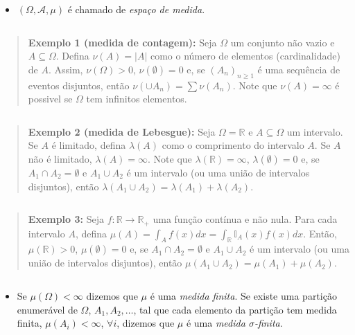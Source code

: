 \documentclass[
]{book}
\providecommand{\tightlist}{%
  \setlength{\itemsep}{0pt}\setlength{\parskip}{0pt}}
\begin{document}
\begin{itemize}
\tightlist
\item
  \((\Omega,\mathcal{A}, \mu)\) é chamado de \emph{espaço de medida}.
\end{itemize}

\(~\)

\begin{quote}
\textbf{Exemplo 1 (medida de contagem):} Seja \(\Omega\) um conjunto não vazio e \(A\subseteq \Omega\). Defina \(\nu(A)=|A|\) como o número de elementos (cardinalidade) de \(A\). Assim, \(\nu(\Omega) > 0\), \(\nu(\emptyset)=0\) e, se \((A_n)_{n \geq 1}\) é uma sequência de eventos disjuntos, então \(\nu(\cup A_n) = \sum \nu(A_n)\). Note que \(\nu(A)=\infty\) é possivel se \(\Omega\) tem infinitos elementos.
\end{quote}

\(~\)

\begin{quote}
\textbf{Exemplo 2 (medida de Lebesgue):} Seja \(\Omega=\mathbb{R}\) e \(A\subseteq \Omega\) um intervalo. Se \(A\) é limitado, defina \(\lambda(A)\) como o comprimento do intervalo \(A\). Se \(A\) não é limitado, \(\lambda(A)=\infty\). Note que \(\lambda(\mathbb{R})=\infty\), \(\lambda(\emptyset)=0\) e, se \(A_1 \cap A_2 = \emptyset\) e \(A_1 \cup A_2\) é um intervalo (ou uma união de intervalos disjuntos), então \(\lambda(A_1 \cup A_2) = \lambda(A_1) + \lambda(A_2)\).
\end{quote}

\(~\)

\begin{quote}
\textbf{Exemplo 3:} Seja \(f: \mathbb{R} \longrightarrow \mathbb{R}_+\) uma função contínua e não nula. Para cada intervalo \(A\), defina \(\displaystyle \mu(A) = \int_A f(x) dx = \int_{\mathbb{R}} \mathbb{I}_A(x) f(x) dx\). Então, \(\mu(\mathbb{R})>0\), \(\mu(\emptyset)=0\) e, se \(A_1 \cap A_2 = \emptyset\) e \(A_1 \cup A_2\) é um intervalo (ou uma união de intervalos disjuntos), então \(\mu(A_1 \cup A_2) = \mu(A_1) + \mu(A_2)\).
\end{quote}

\(~\)

\begin{itemize}
\tightlist
\item
  Se \(\mu(\Omega) < \infty\) dizemos que \(\mu\) é uma \emph{medida finita}. Se existe uma partição enumerável de \(\Omega\), \(A_1,A_2,\ldots\), tal que cada elemento da partição tem medida finita, \(\mu(A_i)<\infty\), \(\forall i\), dizemos que \(\mu\) é uma \emph{medida \(\sigma\)-finita}.
\end{itemize}
\end{document}
